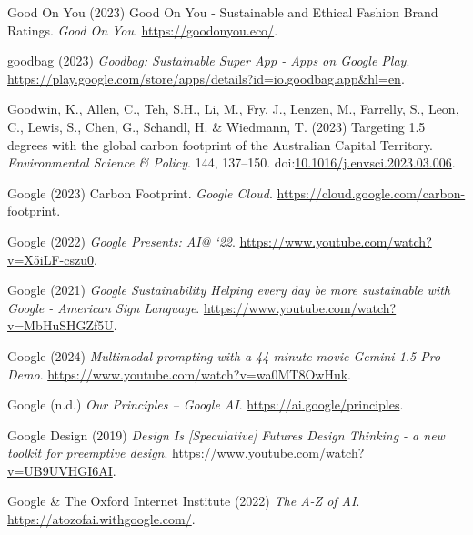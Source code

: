 \documentclass[
  letterpaper,
  DIV=11,
  numbers=noendperiod]{scrartcl}
\newlength{\cslhangindent}
\newenvironment{CSLReferences}[2] %
 {\begin{list}{}{%
  \setlength{\itemindent}{0pt}
  \setlength{\leftmargin}{0pt}
  \setlength{\parsep}{0pt}
  \ifodd #1
   \setlength{\leftmargin}{\cslhangindent}
   \setlength{\itemindent}{-1\cslhangindent}
  \fi
  \setlength{\itemsep}{#2\baselineskip}}}
 {\end{list}}
\begin{document}
\begin{CSLReferences}{0}{1}
Good On You (2023) Good {On You} - {Sustainable} and {Ethical Fashion
Brand Ratings}. \emph{Good On You}. \url{https://goodonyou.eco/}.

goodbag (2023) \emph{Goodbag: {Sustainable Super App} - {Apps} on
{Google Play}}.
\url{https://play.google.com/store/apps/details?id=io.goodbag.app&hl=en}.

Goodwin, K., Allen, C., Teh, S.H., Li, M., Fry, J., Lenzen, M.,
Farrelly, S., Leon, C., Lewis, S., Chen, G., Schandl, H. \& Wiedmann, T.
(2023) Targeting 1.5 degrees with the global carbon footprint of the
{Australian Capital Territory}. \emph{Environmental Science \& Policy}.
144, 137--150.
doi:\href{https://doi.org/10.1016/j.envsci.2023.03.006}{10.1016/j.envsci.2023.03.006}.

Google (2023) Carbon {Footprint}. \emph{Google Cloud}.
\url{https://cloud.google.com/carbon-footprint}.

Google (2022) \emph{Google {Presents}: {AI}@ `22}.
\url{https://www.youtube.com/watch?v=X5iLF-cszu0}.

Google (2021) \emph{Google {Sustainability} {\textbar} {Helping} every
day be more sustainable with {Google} - {American Sign Language}}.
\url{https://www.youtube.com/watch?v=MbHuSHGZf5U}.

Google (2024) \emph{Multimodal prompting with a 44-minute movie
{\textbar} {Gemini} 1.5 {Pro Demo}}.
\url{https://www.youtube.com/watch?v=wa0MT8OwHuk}.

Google (n.d.) \emph{Our {Principles} -- {Google AI}}.
\url{https://ai.google/principles}.

Google Design (2019) \emph{Design {Is} {[}{Speculative}{]} {Futures
Design Thinking} - a new toolkit for preemptive design}.
\url{https://www.youtube.com/watch?v=UB9UVHGI6AI}.

Google \& The Oxford Internet Institute (2022) \emph{The {A-Z} of {AI}}.
\url{https://atozofai.withgoogle.com/}.


\end{CSLReferences}
\end{document}
